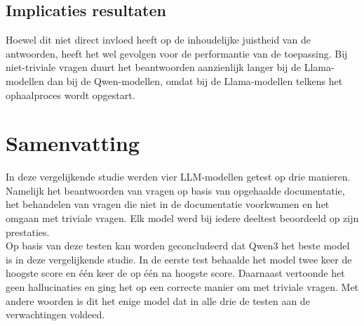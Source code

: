 
\subsection{Implicaties resultaten}
Hoewel dit niet direct invloed heeft op de inhoudelijke juistheid van de antwoorden, heeft het wel gevolgen voor de performantie van de toepassing. Bij niet-triviale vragen duurt het beantwoorden aanzienlijk langer bij de Llama-modellen dan bij de Qwen-modellen, omdat bij de Llama-modellen telkens het ophaalproces wordt opgestart.

\section{Samenvatting}
In deze vergelijkende studie werden vier LLM-modellen getest op drie manieren. Namelijk het beantwoorden van vragen op basis van opgehaalde documentatie, het behandelen van vragen die niet in de documentatie voorkwamen en het omgaan met triviale vragen. Elk model werd bij iedere deeltest beoordeeld op zijn prestaties.
\\[1em]
Op basis van deze testen kan worden geconcludeerd dat Qwen3 het beste model is in deze vergelijkende studie. In de eerste test behaalde het model twee keer de hoogste score en één keer de op één na hoogste score. Daarnaast vertoonde het geen hallucinaties en ging het op een correcte manier om met triviale vragen. Met andere woorden is dit het enige model dat in alle drie de testen aan de verwachtingen voldeed.  

